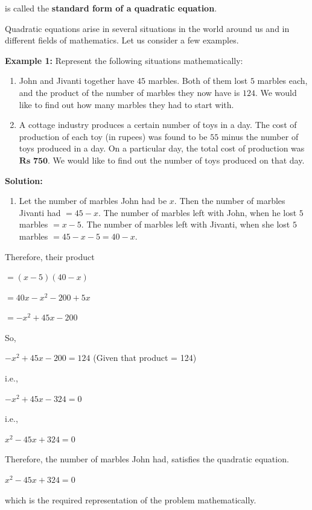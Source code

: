\documentclass[11pt]{article}
\begin{document}
is called the \textbf{standard form of a quadratic equation}.

Quadratic equations arise in several situations in the world around us and in
different fields of mathematics. Let us consider a few examples.

\noindent\textcolor{chapterblue}{\textbf{Example 1:}} Represent the following situations mathematically:

\begin{enumerate}
\item John and Jivanti together have $45$ marbles. Both of them lost $5$ marbles
each, and the product of the number of marbles they now have is $124$. We would
like to find out how many marbles they had to start with.

\item A cottage industry produces a certain number of toys in a day. The cost of production of each toy (in rupees) was found to be $55$ minus the number of toys produced in a day. On a particular day, the total cost of production was $\textbf{Rs 750}$. We would like to find out the number of toys produced on that day.
\end{enumerate}

\noindent\textcolor{chapterblue}{\textbf{Solution:}}

\begin{enumerate}
\item Let the number of marbles John had be $x$. Then the number of marbles Jivanti had $= 45 - x$. The number of marbles left with John, when he lost $5$ marbles $= x - 5$. The number of marbles left with Jivanti, when she lost $5$ marbles
$= 45 - x - 5 = 40 - x$.
\end{enumerate}
Therefore, their product
\begin{center}
$= (x - 5)(40 - x)$
\end{center}
\begin{center}
$= 40x - x^2 - 200 + 5x$
\end{center}

\begin{center}
$= -x^2 + 45x - 200$
\end{center}
So,
\begin{center}
$-x^2 + 45x - 200 = 124$ \quad (Given that product = 124)
\end{center}

i.e.,

\begin{center}
$-x^2 + 45x - 324 = 0$
\end{center}
i.e.,
\begin{center}
$x^2 - 45x + 324 = 0$
\end{center}
Therefore, the number of marbles John had, satisfies the quadratic equation.
\begin{center}
$x^2 - 45x + 324 = 0$
\end{center}
which is the required representation of the problem mathematically.
\end{document}
